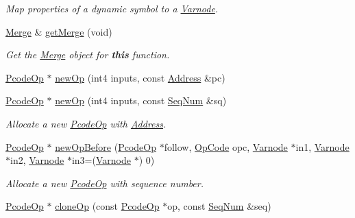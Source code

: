 \begin{DoxyCompactItemize}
\begin{DoxyCompactList}\small\item\em Map properties of a dynamic symbol to a \mbox{\hyperlink{class_varnode}{Varnode}}. \end{DoxyCompactList}\item 
\mbox{\hyperlink{class_merge}{Merge}} \& \mbox{\hyperlink{class_funcdata_ad7716a2ee4e91b0b91ac0487264673ca}{get\+Merge}} (void)
\begin{DoxyCompactList}\small\item\em Get the \mbox{\hyperlink{class_merge}{Merge}} object for {\bfseries{this}} function. \end{DoxyCompactList}\item 
\mbox{\hyperlink{class_pcode_op}{Pcode\+Op}} $\ast$ \mbox{\hyperlink{class_funcdata_a1b1e9831bb4b1c65df6950ae1f15e0be}{new\+Op}} (int4 inputs, const \mbox{\hyperlink{class_address}{Address}} \&pc)
\item 
\mbox{\hyperlink{class_pcode_op}{Pcode\+Op}} $\ast$ \mbox{\hyperlink{class_funcdata_a0d122aa09d739e59a5107338f8ecd8ab}{new\+Op}} (int4 inputs, const \mbox{\hyperlink{class_seq_num}{Seq\+Num}} \&sq)
\begin{DoxyCompactList}\small\item\em Allocate a new \mbox{\hyperlink{class_pcode_op}{Pcode\+Op}} with \mbox{\hyperlink{class_address}{Address}}. \end{DoxyCompactList}\item 
\mbox{\hyperlink{class_pcode_op}{Pcode\+Op}} $\ast$ \mbox{\hyperlink{class_funcdata_ae1126d213d88120c9e55b5779d746859}{new\+Op\+Before}} (\mbox{\hyperlink{class_pcode_op}{Pcode\+Op}} $\ast$follow, \mbox{\hyperlink{opcodes_8hh_abeb7dfb0e9e2b3114e240a405d046ea7}{Op\+Code}} opc, \mbox{\hyperlink{class_varnode}{Varnode}} $\ast$in1, \mbox{\hyperlink{class_varnode}{Varnode}} $\ast$in2, \mbox{\hyperlink{class_varnode}{Varnode}} $\ast$in3=(\mbox{\hyperlink{class_varnode}{Varnode}} $\ast$) 0)
\begin{DoxyCompactList}\small\item\em Allocate a new \mbox{\hyperlink{class_pcode_op}{Pcode\+Op}} with sequence number. \end{DoxyCompactList}\item 
\mbox{\hyperlink{class_pcode_op}{Pcode\+Op}} $\ast$ \mbox{\hyperlink{class_funcdata_a1da8e9506c5b37fce86d165974a4cafb}{clone\+Op}} (const \mbox{\hyperlink{class_pcode_op}{Pcode\+Op}} $\ast$op, const \mbox{\hyperlink{class_seq_num}{Seq\+Num}} \&seq)
\item 

\end{DoxyCompactItemize}
